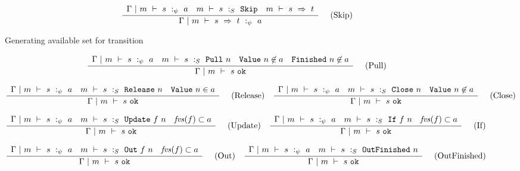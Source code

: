 \begin{figure*}
$$
\frac {\displaystyle 
    \begin{array}{lcr}
        \Gamma ~|~ m ~\vdash~ s ~:_\psi~ a                 &
        m ~\vdash~ s ~:_S~ \mathtt{Skip}    &
        m ~\vdash~ s ~\Rightarrow~ t
    \end{array}
} {\displaystyle  
    \Gamma ~|~ m ~\vdash~ s~\Rightarrow~t ~:_\psi~  a 
} \ 
\quad
\textrm{(Skip)}
$$


\caption{Generating available set for transition}
\label{fig:inv:generation}
\end{figure*}

\begin{figure*}

$$
\frac {\displaystyle 
    \begin{array}{lccr}
        \Gamma ~|~ m ~\vdash~ s ~:_\psi~ a                    &
        m ~\vdash~ s ~:_S~ \mathtt{Pull}~n    &
        \mathtt{Value}~n \not\in a             &
        \mathtt{Finished}~n \not\in a
    \end{array}
} {\displaystyle  
    \Gamma ~|~ m ~\vdash~ s~\mathtt{ok}
} \ 
\quad
\textrm{(Pull)}
$$

$$
\frac {\displaystyle 
    \begin{array}{lcr}
        \Gamma ~|~ m ~\vdash~ s ~:_\psi~ a                        &
        m ~\vdash~ s ~:_S~ \mathtt{Release}~n    &
        \mathtt{Value}~n \in a
    \end{array}
} {\displaystyle  
    \Gamma ~|~ m ~\vdash~ s~\mathtt{ok}
} \ 
\quad
\textrm{(Release)}
\quad
\frac {\displaystyle 
    \begin{array}{lcr}
        \Gamma ~|~ m ~\vdash~ s ~:_\psi~ a                    &
        m ~\vdash~ s ~:_S~ \mathtt{Close}~n    &
        \mathtt{Value}~n \not\in a
    \end{array}
} {\displaystyle  
    \Gamma ~|~ m ~\vdash~ s~\mathtt{ok}
} \ 
\quad
\textrm{(Close)}
$$

$$
\frac {\displaystyle 
    \begin{array}{lcr}
        \Gamma ~|~ m ~\vdash~ s ~:_\psi~ a                        &
        m ~\vdash~ s ~:_S~ \mathtt{Update}~f~n    &
        \mathit{fvs}(f) \subset a
    \end{array}
} {\displaystyle  
    \Gamma ~|~ m ~\vdash~ s~\mathtt{ok}
} \ 
\quad
\textrm{(Update)}
\quad
\frac {\displaystyle 
    \begin{array}{lcr}
        \Gamma ~|~ m ~\vdash~ s ~:_\psi~ a                        &
        m ~\vdash~ s ~:_S~ \mathtt{If}~f~n    &
        \mathit{fvs}(f) \subset a
    \end{array}
} {\displaystyle  
    \Gamma ~|~ m ~\vdash~ s~\mathtt{ok}
} \ 
\quad
\textrm{(If)}
$$

$$
\frac {\displaystyle 
    \begin{array}{lcr}
        \Gamma ~|~ m ~\vdash~ s ~:_\psi~ a                      &
        m ~\vdash~ s ~:_S~ \mathtt{Out}~f~n    &
        \mathit{fvs}(f) \subset a
    \end{array}
} {\displaystyle  
    \Gamma ~|~ m ~\vdash~ s~\mathtt{ok}
} \ 
\quad
\textrm{(Out)}
\quad
\frac {\displaystyle 
    \begin{array}{lr}
        \Gamma ~|~ m ~\vdash~ s ~:_\psi~ a                            &
        m ~\vdash~ s ~:_S~ \mathtt{OutFinished}~n
    \end{array}
} {\displaystyle  
    \Gamma ~|~ m ~\vdash~ s~\mathtt{ok}
} \ 
\quad
\textrm{(OutFinished)}
$$


\end{figure*}
